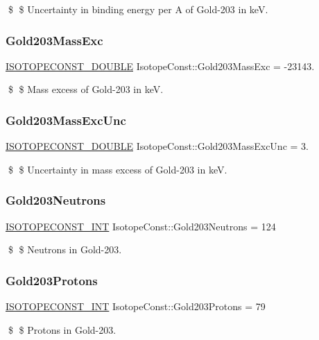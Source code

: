 \$ \$ Uncertainty in binding energy per A of Gold-\/203 in keV. \mbox{\label{group___isotope_const-_gold-_au203_ga6dc09dc9aa3ad8c7e5956cde1dd8b655}} 
\subsubsection{\texorpdfstring{Gold203\+Mass\+Exc}{Gold203MassExc}}
{\footnotesize\ttfamily \mbox{\hyperlink{group___isotope_const-_macros_ga8f45a7272ce02c0b4c65c44636ed719a}{I\+S\+O\+T\+O\+P\+E\+C\+O\+N\+S\+T\+\_\+\+D\+O\+U\+B\+LE}} Isotope\+Const\+::\+Gold203\+Mass\+Exc = -\/23143.}

\$ \$ Mass excess of Gold-\/203 in keV. \mbox{\label{group___isotope_const-_gold-_au203_ga405358145cda62a85603d1c51173f5c8}} 
\subsubsection{\texorpdfstring{Gold203\+Mass\+Exc\+Unc}{Gold203MassExcUnc}}
{\footnotesize\ttfamily \mbox{\hyperlink{group___isotope_const-_macros_ga8f45a7272ce02c0b4c65c44636ed719a}{I\+S\+O\+T\+O\+P\+E\+C\+O\+N\+S\+T\+\_\+\+D\+O\+U\+B\+LE}} Isotope\+Const\+::\+Gold203\+Mass\+Exc\+Unc = 3.}

\$ \$ Uncertainty in mass excess of Gold-\/203 in keV. \mbox{\label{group___isotope_const-_gold-_au203_ga7f50d7bcb092bbf2fd8f3a5861a205e2}} 
\subsubsection{\texorpdfstring{Gold203\+Neutrons}{Gold203Neutrons}}
{\footnotesize\ttfamily \mbox{\hyperlink{group___isotope_const-_macros_ga5f18360b3e99483a35c32d789e62621c}{I\+S\+O\+T\+O\+P\+E\+C\+O\+N\+S\+T\+\_\+\+I\+NT}} Isotope\+Const\+::\+Gold203\+Neutrons = 124}

\$ \$ Neutrons in Gold-\/203. \mbox{\label{group___isotope_const-_gold-_au203_ga66f29c66d5ff1025b743f88d4ba8d67d}} 
\subsubsection{\texorpdfstring{Gold203\+Protons}{Gold203Protons}}
{\footnotesize\ttfamily \mbox{\hyperlink{group___isotope_const-_macros_ga5f18360b3e99483a35c32d789e62621c}{I\+S\+O\+T\+O\+P\+E\+C\+O\+N\+S\+T\+\_\+\+I\+NT}} Isotope\+Const\+::\+Gold203\+Protons = 79}

\$ \$ Protons in Gold-\/203. 